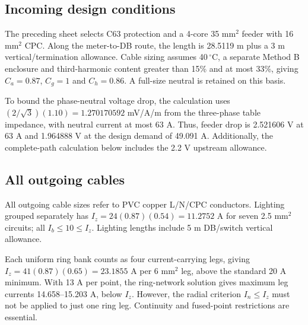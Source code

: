 \subsection*{Incoming design conditions}
The preceding sheet selects C63 protection and a 4-core 35 mm$^2$ feeder with 16 mm$^2$ CPC. Along the meter-to-DB route, the length is 28.5119 m plus a 3 m vertical/termination allowance. Cable sizing assumes 40\,$^\circ$C, a separate Method B enclosure and third-harmonic content greater than 15\% and at most 33\%, giving $C_a=0.87$, $C_g=1$ and $C_h=0.86$. A full-size neutral is retained on this basis.

To bound the phase-neutral voltage drop, the calculation uses $(2/\sqrt3)(1.10)=1.270170592$ mV/A/m from the three-phase table impedance, with neutral current at most 63 A. Thus, feeder drop is 2.521606 V at 63 A and 1.964888 V at the design demand of 49.091 A. Additionally, the complete-path calculation below includes the 2.2 V upstream allowance.

\subsection*{All outgoing cables}
All outgoing cable sizes refer to PVC copper L/N/CPC conductors. Lighting grouped separately has $I_z=24(0.87)(0.54)=11.2752$ A for seven 2.5 mm$^2$ circuits;  all $I_b\le 10\le I_z$. Lighting lengths include 5 m DB/switch vertical allowance.

Each uniform ring bank counts as four current-carrying legs, giving $I_z=41(0.87)(0.65)=23.1855$ A per 6 mm$^2$ leg, above the standard 20 A minimum. With 13 A per point, the ring-network solution gives maximum leg currents 14.658--15.203 A, below $I_z$. However, the radial criterion $I_n\le I_z$ must not be applied to just one ring leg. Continuity and fused-point restrictions are essential.

